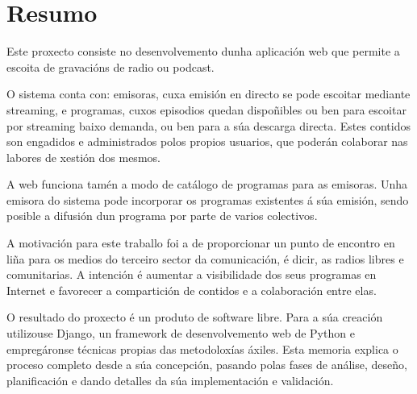 \thispagestyle{plain}
\section*{Resumo}

Este proxecto consiste no desenvolvemento dunha aplicación web que permite a escoita de gravacións de radio ou podcast.

O sistema conta con: emisoras, cuxa emisión en directo se pode escoitar mediante streaming, e programas, cuxos episodios quedan dispoñibles ou ben para escoitar por streaming baixo demanda, ou ben para a súa descarga directa. Estes contidos son engadidos e administrados polos propios usuarios, que poderán colaborar nas labores de xestión dos mesmos.

A web funciona tamén a modo de catálogo de programas para as emisoras. Unha emisora do sistema pode incorporar os programas existentes á súa emisión, sendo posible a difusión dun programa por parte de varios colectivos. 

A motivación para este traballo foi a de proporcionar un punto de encontro en liña para os medios do terceiro sector da comunicación, é dicir, as radios libres e comunitarias. A intención é aumentar a visibilidade dos seus programas en Internet e favorecer a compartición de contidos e a colaboración entre elas.

O resultado do proxecto é un produto de software libre. Para a súa creación utilizouse Django, un framework de desenvolvemento web de Python e empregáronse técnicas propias das metodoloxías áxiles. Esta memoria explica o proceso completo desde a súa concepción, pasando polas fases de análise, deseño, planificación e dando detalles da súa implementación e validación.




   
